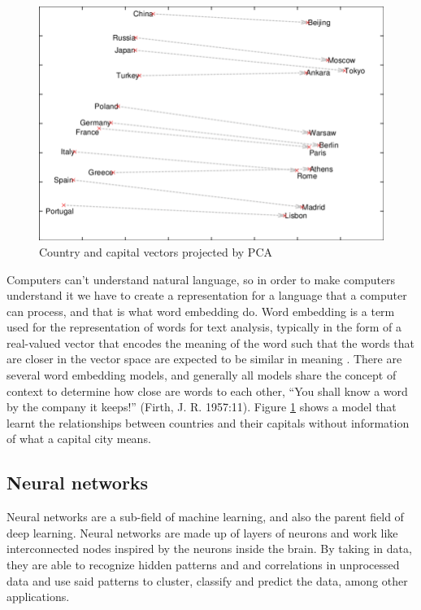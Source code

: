 \documentclass[12pt]{diazessay}
\newcounter{subsubsubsection}[subsubsection]
\begin{document}
            
            \begin{figure}[h]
                \centering
                \includegraphics[scale=0.42]{Figures/embeddings_fig.png}
                \caption{Country and capital vectors projected by PCA \cite{PCA_article}}
                \label{fig:wordembedding}
            \end{figure}
            
            Computers can’t understand natural language, so in order to make computers understand it we have to create a representation for a language that a computer can process, and that is what word embedding do. Word embedding is a term used for the representation of words for text analysis, typically in the form of a real-valued vector that encodes the meaning of the word such that the words that are closer in the vector space are expected to be similar in meaning \cite{jurafsky_martin_2000}. There are several word embedding models, and generally all models share the concept of context to determine how close are words to each other, “You shall know a word by the company it keeps!” (Firth, J. R. 1957:11). Figure \ref{fig:wordembedding} shows a model that learnt the relationships between countries and their capitals without information of what a capital city means.
    
        
    \subsection{Neural networks}
        Neural networks are a sub-field of machine learning, and also the parent field of deep learning. Neural networks are made up of layers of neurons and work like interconnected nodes inspired by the neurons inside the brain. By taking in data, they are able to recognize hidden patterns and and correlations in unprocessed data and use said patterns to cluster, classify and predict the data, among other applications.
        
\end{document}
